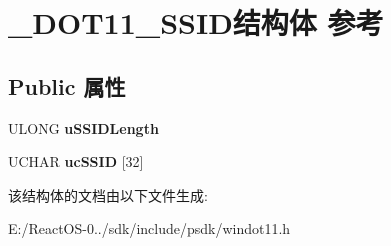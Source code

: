 \hypertarget{struct___d_o_t11___s_s_i_d}{}\section{\+\_\+\+D\+O\+T11\+\_\+\+S\+S\+I\+D结构体 参考}
\label{struct___d_o_t11___s_s_i_d}
\subsection*{Public 属性}
\begin{DoxyCompactItemize}
\item 
\mbox{\label{struct___d_o_t11___s_s_i_d_abdc85afa1bba7c52ec30e061eb11f6f3}} 
U\+L\+O\+NG {\bfseries u\+S\+S\+I\+D\+Length}
\item 
\mbox{\label{struct___d_o_t11___s_s_i_d_ad2b7c7b1dbd96da0cba99a4aa72bba6b}} 
U\+C\+H\+AR {\bfseries uc\+S\+S\+ID} \mbox{[}32\mbox{]}
\end{DoxyCompactItemize}


该结构体的文档由以下文件生成\+:\begin{DoxyCompactItemize}
\item 
E\+:/\+React\+O\+S-\/0../sdk/include/psdk/windot11.\+h\end{DoxyCompactItemize}
